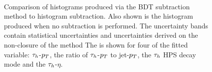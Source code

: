 \begin{figure}[!hbtp]
\centering
     \\
\caption{Comparison of histograms produced via the BDT subtraction method to histogram subtraction. Also shown is the histogram produced when no subtraction is performed. The uncertainty bands contain statistical uncertainties and uncertainties derived on the non-closure of the method The is shown for four of the fitted variable: $\tau_{h}$-$p_{T}$, the ratio of $\tau_{h}$-$p_{T}$ to jet-$p_{T}$, the $\tau_{h}$ HPS decay mode and the $\tau_{h}$-$\eta$.}
\label{fig:4tau_ff_subtraction}
\end{figure}

